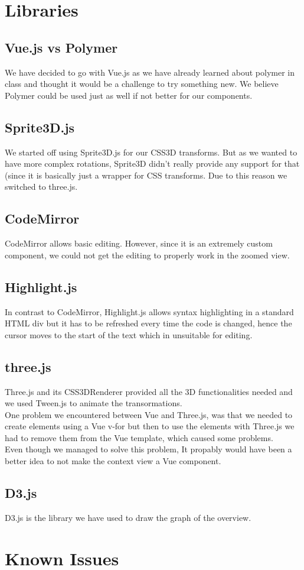\documentclass[a4paper]{article}
\begin{document}
\section{Libraries}
\subsection{Vue.js vs Polymer}
We have decided to go with Vue.js as we have already learned about polymer in class and thought it would be a challenge to try something new. We believe Polymer could be used just as well if not better for our components.
\subsection{Sprite3D.js}
We started off using Sprite3D.js for our CSS3D transforms. But as we wanted to have more complex rotations, Sprite3D didn't really provide any support for that (since it is basically just a wrapper for CSS transforms.
Due to this reason we   switched to three.js.
\subsection{CodeMirror}
CodeMirror allows basic editing. However, since it is an extremely custom component, we could not get the editing to properly work in the zoomed view.
\subsection{Highlight.js}
In contrast to CodeMirror, Highlight.js allows syntax highlighting in a standard HTML div but it has to be refreshed every time the code is changed, hence the cursor moves to the start of the text which in unsuitable for editing.
\subsection{three.js}
Three.js and its CSS3DRenderer provided all the 3D functionalities needed and we used Tween.js to animate the transormations. 
\\One problem we encountered between Vue and Three.js, was that we needed to create elements using a Vue v-for but then to use the elements with Three.js we had to remove them from the Vue template, which caused some problems. \\
Even though  we managed to solve this problem, It propably would have been a better idea to not make the context view a Vue component.
\subsection{D3.js}
D3.js is the library we have used to draw the graph of the overview.
\section{Known Issues}

\end{document}
